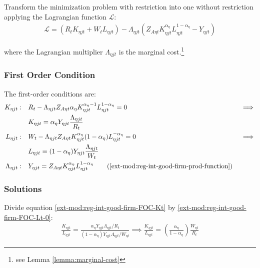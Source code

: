 \documentclass[../thesis.tex]{subfiles}
\begin{document}
Transform the minimization problem with restriction into one without restriction applying the Lagrangian function $\mathcal{L}$:
\begin{align}
	\label{ext-mod:reg-int-good-firm-lagrangian}
	\mathcal{L} = (R_{t} K_{\eta jt} + W_t L_{\eta jt}) - \Lambda_{\eta jt} (Z_{A\eta t} K_{\eta jt}^{\alpha_{\eta}} L_{\eta jt}^{1-{\alpha_{\eta}}} - Y_{\eta jt})
\end{align}

where the Lagrangian multiplier $\Lambda_{\eta jt}$ is the marginal cost.\footnote{see Lemma \ref{lemma:marginal-cost}}

\subsubsection*{First Order Condition}

The first-order conditions are:
\begin{alignat}{2}
	K_{\eta jt}: \quad & R_{t} - \Lambda_{\eta jt} Z_{A\eta t} {\alpha_{\eta}} K_{\eta jt}^{{\alpha_{\eta}}-1} L_{\eta jt}^{1-{\alpha_{\eta}}} = 0 &&\implies \nonumber \\
	& K_{\eta jt} = {\alpha_{\eta}} Y_{\eta jt} \frac{\Lambda_{\eta jt}}{R_{t}} \label{ext-mod:reg-int-good-firm-FOC-Kt} \\
	L_{\eta jt}: \quad & W_t - \Lambda_{\eta jt} Z_{A\eta t} K_{\eta jt}^{\alpha_{\eta}} (1-{\alpha_{\eta}}) L_{\eta jt}^{-{\alpha_{\eta}}} = 0 \quad &&\implies \nonumber \\ 
	& L_{\eta jt} = (1-{\alpha_{\eta}}) Y_{\eta jt} \frac{\Lambda_{\eta jt}}{W_t} \label{ext-mod:reg-int-good-firm-FOC-Lt-0} \\
	\Lambda_{\eta jt}: \quad & Y_{\eta jt} = Z_{A\eta t} K_{\eta jt}^{\alpha_{\eta}} L_{\eta jt}^{1-{\alpha_{\eta}}} \tag{\ref{ext-mod:reg-int-good-firm-prod-function}}
\end{alignat}

\subsubsection*{Solutions}

Divide equation \ref{ext-mod:reg-int-good-firm-FOC-Kt} by \ref{ext-mod:reg-int-good-firm-FOC-Lt-0}:
\begin{align}
	\frac{K_{\eta jt}}{L_{\eta jt}} = \frac{{\alpha_{\eta}} Y_{\eta jt} \Lambda_{\eta jt} /R_{t}}{(1-\alpha_{\eta}) Y_{\eta jt} \Lambda_{\eta jt} /W_{\eta t}} \implies
	\frac{K_{\eta jt}}{L_{\eta jt}} = \left( \frac{{\alpha_{\eta}}}{1-\alpha_{\eta}} \right) \frac{W_{\eta t}}{R_{t}} \label{ext-mod:reg-int-good-firm-TMRS}
\end{align}
\end{document}
